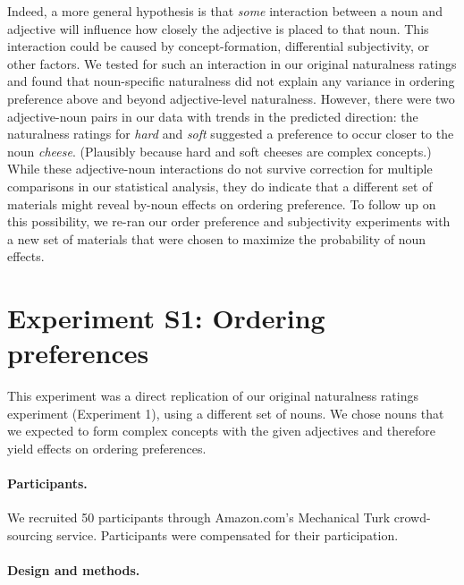 \documentclass[12pt]{article}
\begin{document}
%
Indeed, a more general hypothesis is that \emph{some} interaction between a noun and adjective will influence how closely the adjective is placed to that noun. This interaction could be caused by concept-formation, differential subjectivity, or other factors. We tested for such an interaction in our original naturalness ratings and found that noun-specific naturalness did not explain any variance in ordering preference above and beyond adjective-level naturalness. However, there were two adjective-noun pairs in our data with trends in the predicted direction: the naturalness ratings for \emph{hard} and \emph{soft} suggested a preference to occur closer to the noun \emph{cheese}. (Plausibly because hard and soft cheeses are complex concepts.) While these adjective-noun interactions do not survive correction for multiple comparisons in our statistical analysis, they do indicate that a different set of materials might reveal by-noun effects on ordering preference. To follow up on this possibility, we re-ran our order preference and subjectivity experiments with a new set of materials that were chosen to maximize the probability of noun effects.


\section*{Experiment S1: Ordering preferences}

This experiment was a direct replication of our original naturalness ratings experiment (Experiment 1), using a different set of nouns. We chose nouns that we expected to form complex concepts with the given adjectives and therefore yield effects on ordering preferences.

\paragraph{Participants.}

We recruited 50 participants through Amazon.com's Mechanical Turk crowd-sourcing service. Participants were compensated for their participation.

\paragraph{Design and methods.}
\end{document}
